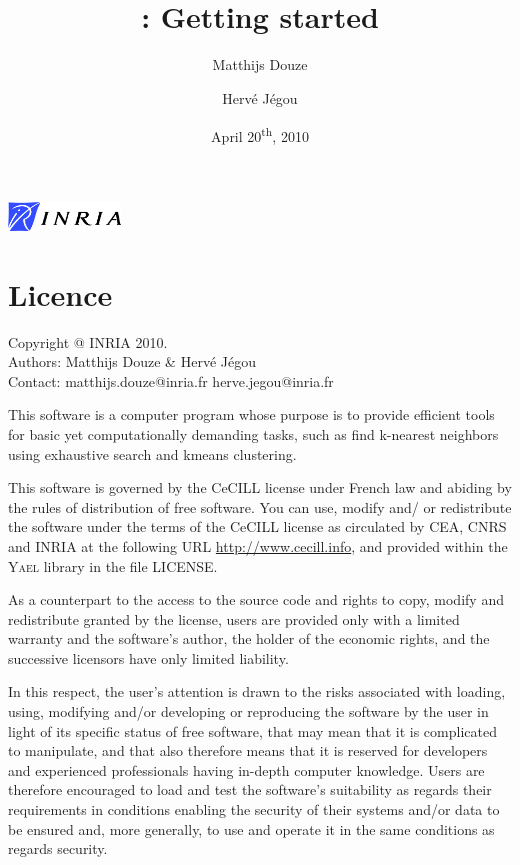 \documentclass[a4paper,11pt,notitlepage,final,twoside]{report}
\title{~\vspace{9cm} \\ \yael: Getting started}
\author{Matthijs Douze \and Herv\'e J\'egou}
\date{April 20\textsuperscript{th}, 2010}
\newcommand{\yael}{\textsc{Yael}\xspace}
\begin{document}
\maketitle
\thispagestyle{empty}

\vfill

\includegraphics[width=3cm]{./figs/logoinria}


\newpage

\chapter*{Licence}

\thispagestyle{empty}

Copyright @ INRIA 2010. \\
Authors: Matthijs Douze \& Herv\'e J\'egou \\
Contact: matthijs.douze@inria.fr  herve.jegou@inria.fr \\
\medskip

This software is a computer program whose purpose is to provide 
efficient tools for basic yet computationally demanding tasks, 
such as find k-nearest neighbors using exhaustive search 
and kmeans clustering. 
\medskip

This software is governed by the CeCILL license under French law and
abiding by the rules of distribution of free software.  You can  use, 
modify and/ or redistribute the software under the terms of the CeCILL
license as circulated by CEA, CNRS and INRIA at the following URL
\url{http://www.cecill.info}, and provided within the \yael library 
in the file LICENSE. 
\medskip

As a counterpart to the access to the source code and  rights to copy,
modify and redistribute granted by the license, users are provided only
with a limited warranty  and the software's author,  the holder of the
economic rights,  and the successive licensors  have only  limited
liability. 
\medskip

In this respect, the user's attention is drawn to the risks associated
with loading,  using,  modifying and/or developing or reproducing the
software by the user in light of its specific status of free software,
that may mean  that it is complicated to manipulate,  and  that  also
therefore means  that it is reserved for developers  and  experienced
professionals having in-depth computer knowledge. Users are therefore
encouraged to load and test the software's suitability as regards their
requirements in conditions enabling the security of their systems and/or 
data to be ensured and,  more generally, to use and operate it in the 
same conditions as regards security. 
\medskip
\end{document}
